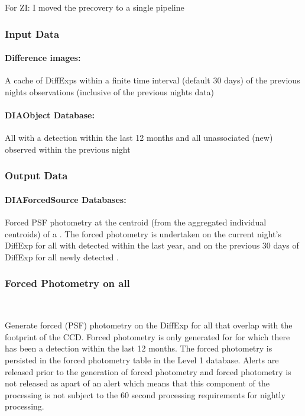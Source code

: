 \begin{note}{For ZI: I moved the precovery to a single pipeline}\end{note}
\subsubsection{Input Data}

\paragraph*{Difference images:} A cache of DiffExps within a finite time interval (default 30 days) of the previous nights observations (inclusive of the previous nights data)

\paragraph*{DIAObject Database:} All \DIAObjects with a \DIASource detection within the last 12 months and all unassociated (new) \DIAObjects observed within the previous night


\subsubsection{Output Data}

\paragraph*{DIAForcedSource Databases:} Forced PSF photometry at the centroid (from the aggregated individual \DIASource centroids) of a \DIAObject. The forced photometry is undertaken on the current night's DiffExp for all \DIAObjects with \DIASources detected within the last year, and on the previous 30 days of DiffExp for all newly detected \DIASources.


\subsubsection{Forced Photometry on all \DIAObjects}~

Generate forced (PSF) photometry on the DiffExp for all \DIAObjects that overlap with the footprint of the CCD. Forced photometry is only generated for \DIAObjects for which there has been a \DIASource detection within the last 12 months. The forced photometry is persisted in the forced photometry table in the Level 1 database. Alerts are released prior to the generation of forced photometry and forced photometry is not released as apart of an alert which means that this component of the processing is not subject to the 60 second processing requirements for nightly processing.


